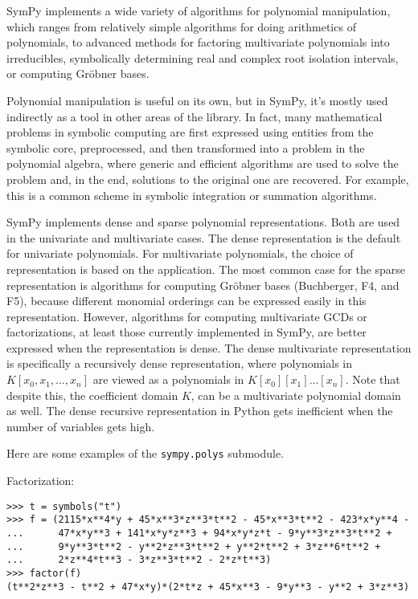 
SymPy implements a wide variety of algorithms for polynomial manipulation,
which ranges from relatively simple algorithms for doing arithmetics of
polynomials, to advanced methods for factoring multivariate polynomials
into irreducibles, symbolically determining real and complex root isolation
intervals, or computing Gr\"{o}bner bases.

Polynomial manipulation is useful on its own, but in SymPy, it's mostly used
indirectly as a tool in other areas of the library. In fact, many mathematical
problems in symbolic computing are first expressed using entities from the
symbolic core, preprocessed, and then transformed into a problem in the
polynomial algebra, where generic and efficient algorithms are used to solve
the problem and, in the end, solutions to the original one are recovered. For
example, this is a common scheme in symbolic integration or summation
algorithms.

SymPy implements dense and sparse polynomial representations. Both are used in
the univariate and multivariate cases. The dense representation is the default
for univariate polynomials. For multivariate polynomials, the choice of
representation is based on the application. The most common case for the sparse
representation is algorithms for computing Gr\"{o}bner bases (Buchberger, F4,
and F5),
because different monomial orderings can be expressed easily in this
representation. However, algorithms for computing multivariate GCDs or
factorizations, at least those currently implemented in SymPy,
are better expressed when the representation is dense. The dense multivariate
representation is specifically a recursively dense representation, where
polynomials in $K[x_0, x_1,\dots, x_n]$ are viewed as a polynomials in
$K[x_0][x_1]\ldots[x_n]$. Note that despite this, the coefficient domain $K$,
can be a multivariate polynomial domain as well. The dense recursive
representation in Python gets inefficient when the number of variables gets
high.

Here are some examples of the \texttt{sympy.polys} submodule.

\noindent Factorization:
\begin{verbatim}
>>> t = symbols("t")
>>> f = (2115*x**4*y + 45*x**3*z**3*t**2 - 45*x**3*t**2 - 423*x*y**4 -
...      47*x*y**3 + 141*x*y*z**3 + 94*x*y*z*t - 9*y**3*z**3*t**2 +
...      9*y**3*t**2 - y**2*z**3*t**2 + y**2*t**2 + 3*z**6*t**2 +
...      2*z**4*t**3 - 3*z**3*t**2 - 2*z*t**3)
>>> factor(f)
(t**2*z**3 - t**2 + 47*x*y)*(2*t*z + 45*x**3 - 9*y**3 - y**2 + 3*z**3)
\end{verbatim}

